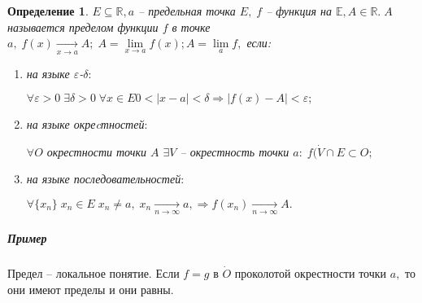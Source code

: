 \documentclass{article}
\newtheorem{Definition}{Определение}[section]
\begin{document}
\begin{Definition}
$E\subseteq\mathbb{R}, a$ -- предельная точка $E, \; f$ -- функция на $\mathbb{E}, A\in\mathbb{R}. \; A$ называется пределом функции $f$ в точке $a, \;f(x)\xrightarrow[x\rightarrow a]{} A; \; A=\lim\limits_{x\rightarrow a} f(x); A=\lim\limits_{a}f,$ если:
\begin{enumerate}
\item на языке $\varepsilon$-$\delta:$

$\forall\varepsilon>0 \;\exists\delta>0\;\forall x\in E 0<\mid x-a\mid<\delta \Rightarrow \mid f(x)-A\mid<\varepsilon;$

\item на языке окреcтностей$:$

$\forall O$ окрестности точки $A$ $\exists V$ -- окрестность точки $a: \; f(\dot{V}\cap E \subset O;$

\item на языке последовательностей$:$

$\forall\{x_n\} \; x_n\in E \; x_n\neq a, \; x_n\xrightarrow[n\rightarrow\infty]{} a,  \Rightarrow f(x_n)\xrightarrow[n\rightarrow\infty]{} A.$
\end{enumerate}
\end{Definition}

\subparagraph{Пример}


Предел -- локальное понятие. Если $f=g$ в $\dot{O}$ проколотой окрестности точки $a,$ то они имеют пределы и они равны.
\end{document}

